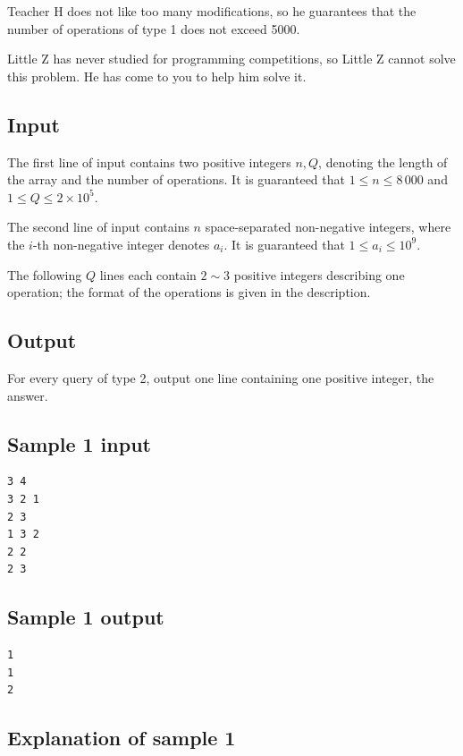 \documentclass[11pt]{article}
\begin{document}
Teacher H does not like too many modifications, so he guarantees that the
number of operations of type 1 does not exceed 5000.

Little Z has never studied for programming competitions, so Little Z
cannot solve this problem.
He has come to you to help him solve it.

\subsection*{Input}

The first line of input contains two positive integers $n, Q$,
denoting the length of the array and the number of operations.
It is guaranteed that $1 \le n \le 8\,000$ and $1 \le Q \le 2 \times 10^5$.

The second line of input contains $n$ space-separated non-negative
integers, where the $i$-th non-negative integer denotes $a_i$.
It is guaranteed that $1 \le a_i \le 10^9$.

The following $Q$ lines each contain $2 \sim 3$ positive integers
describing one operation;
the format of the operations is given in the description.

\subsection*{Output}

For every query of type 2, output one line containing one positive integer,
the answer.

\subsection*{Sample 1 input}

\begin{verbatim}
3 4
3 2 1
2 3
1 3 2
2 2
2 3
\end{verbatim}

\subsection*{Sample 1 output}

\begin{verbatim}
1
1
2
\end{verbatim}

\subsection*{Explanation of sample 1}
\end{document}
